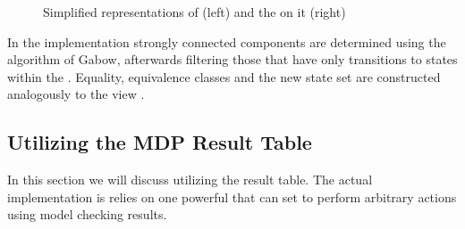 \documentclass[preview]{standalone}
\begin{document}
\begin{figure}[h]
	\begin{minipage}{.55\textwidth}
		\hspace{5mm}
		
	\end{minipage}
	\begin{minipage}{.5\textwidth}		
		
	\end{minipage}
	\caption{Simplified representations of \mdp (left) and the \viewN \viewbscc on it (right)}
	\label{fig:bsccAfter}  
\end{figure}

In the implementation strongly connected components are determined using the algorithm of Gabow, afterwards filtering those \sccsN that have only transitions to states within the \sccN. Equality, equivalence classes and the new state set are constructed analogously to the view \viewscc.

\subsection{Utilizing the MDP Result Table}
In this section we will discuss \viewsN utilizing the result table. The actual implementation is relies on one powerful \viewN that can set to perform arbitrary actions using model checking results.


	
\end{document}
